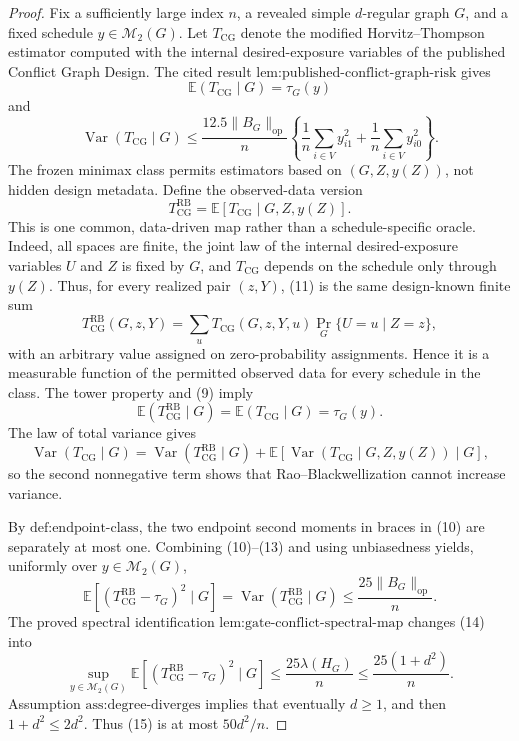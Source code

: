 \documentclass{article}
\begin{document}
\begin{proof}
Fix a sufficiently large index \(n\), a revealed simple \(d\)-regular graph \(G\), and a fixed schedule \(y\in\mathcal M_2(G)\).  Let \(T_{\mathrm{CG}}\) denote the modified Horvitz--Thompson estimator computed with the internal desired-exposure variables of the published Conflict Graph Design.  The cited result \(\text{lem:published-conflict-graph-risk}\) gives
\[
\mathbb E(T_{\mathrm{CG}}\mid G)=\tau_G(y) \tag{9}
\]
and
\[
\operatorname{Var}(T_{\mathrm{CG}}\mid G)
\le \frac{12.5\|B_G\|_{\mathrm{op}}}{n}
\left\{\frac1n\sum_{i\in V}y_{i1}^2+
\frac1n\sum_{i\in V}y_{i0}^2\right\}. \tag{10}
\]
The frozen minimax class permits estimators based on \((G,Z,y(Z))\), not hidden design metadata.  Define the observed-data version
\[
T_{\mathrm{CG}}^{\mathrm{RB}}
=\mathbb E[T_{\mathrm{CG}}\mid G,Z,y(Z)]. \tag{11}
\]
This is one common, data-driven map rather than a schedule-specific oracle.  Indeed, all spaces are finite, the joint law of the internal desired-exposure variables \(U\) and \(Z\) is fixed by \(G\), and \(T_{\mathrm{CG}}\) depends on the schedule only through \(y(Z)\).  Thus, for every realized pair \((z,Y)\), (11) is the same design-known finite sum
\[
T_{\mathrm{CG}}^{\mathrm{RB}}(G,z,Y)
=\sum_u T_{\mathrm{CG}}(G,z,Y,u)\Pr_G\{U=u\mid Z=z\},
\]
with an arbitrary value assigned on zero-probability assignments.  Hence it is a measurable function of the permitted observed data for every schedule in the class.  The tower property and (9) imply
\[
\mathbb E(T_{\mathrm{CG}}^{\mathrm{RB}}\mid G)
=\mathbb E(T_{\mathrm{CG}}\mid G)=\tau_G(y). \tag{12}
\]
The law of total variance gives
\[
\operatorname{Var}(T_{\mathrm{CG}}\mid G)
=\operatorname{Var}(T_{\mathrm{CG}}^{\mathrm{RB}}\mid G)
+\mathbb E\!\left[\operatorname{Var}(T_{\mathrm{CG}}\mid G,Z,y(Z))\mid G\right], \tag{13}
\]
so the second nonnegative term shows that Rao--Blackwellization cannot increase variance.

By \(\text{def:endpoint-class}\), the two endpoint second moments in braces in (10) are separately at most one.  Combining (10)--(13) and using unbiasedness yields, uniformly over \(y\in\mathcal M_2(G)\),
\[
\mathbb E[(T_{\mathrm{CG}}^{\mathrm{RB}}-\tau_G)^2\mid G]
=\operatorname{Var}(T_{\mathrm{CG}}^{\mathrm{RB}}\mid G)
\le\frac{25\|B_G\|_{\mathrm{op}}}{n}. \tag{14}
\]
The proved spectral identification \(\text{lem:gate-conflict-spectral-map}\) changes (14) into
\[
\sup_{y\in\mathcal M_2(G)}
\mathbb E[(T_{\mathrm{CG}}^{\mathrm{RB}}-\tau_G)^2\mid G]
\le\frac{25\lambda(H_G)}{n}
\le\frac{25(1+d^2)}{n}. \tag{15}
\]
Assumption \(\text{ass:degree-diverges}\) implies that eventually \(d\ge1\), and then \(1+d^2\le2d^2\).  Thus (15) is at most \(50d^2/n\).


\end{proof}
\end{document}
